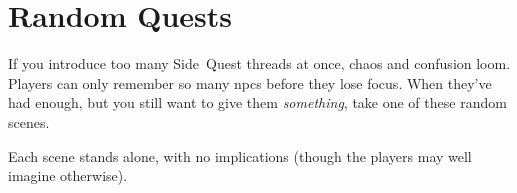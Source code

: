 \chapter{Random Quests}

If you introduce too many Side~Quest threads at once, chaos and confusion loom.
Players can only remember so many \glspl{npc} before they lose focus.
When they've had enough, but you still want to give them \emph{something}, take one of these random scenes.

Each scene stands alone, with no implications (though the players may well imagine otherwise).


